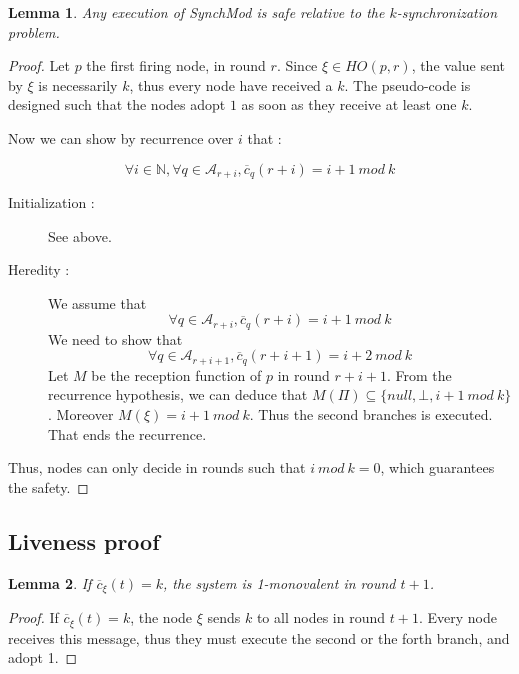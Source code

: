 \documentclass{article}
\newtheorem{lemma}{Lemma}[section]
\begin{document}
\begin{lemma}\label{lem:safety}
	Any execution of SynchMod is safe relative to the $k$-synchronization problem.
\end{lemma}
\begin{proof}
	Let $p$ the first firing node, in round $r$.
	Since $\xi \in HO(p,r)$, the value sent by $\xi$ is necessarily $k$, thus every node have received a $k$.
	The pseudo-code is designed such that the nodes adopt $1$ as soon as they receive at least one $k$.

	Now we can show by recurrence over $i$ that :

	$$\forall i \in \mathds{N}, \forall q \in \mathcal{A}_{r+i}, \overline{c}_q(r+i) = i + 1~mod~k$$

	\begin{description}
		\item[Initialization :] See above.
		\item[Heredity :] We assume that 
			$$\forall q \in \mathcal{A}_{r+i}, \overline{c}_q(r+i) = i + 1~mod~k$$
	We need to show that 
			$$\forall q \in \mathcal{A}_{r+i+1}, \overline{c}_q(r+i+1) = i + 2~mod~k$$
	Let $M$ be the reception function of $p$ in round $r+i+1$.
			From the recurrence hypothesis, we can deduce that $M(\Pi) \subseteq \{null, \bot, i+1~mod~k\}$.
			Moreover $M(\xi) = i+1~mod~k$.
			Thus the second branches is executed. That ends the recurrence.
	\end{description}

	Thus, nodes can only decide in rounds such that $i~mod~k = 0$, which guarantees the safety.
\end{proof}

\subsection{Liveness proof}

\begin{lemma}\label{lem:k_mono}
	If $\overline{c}_\xi(t) = k$, the system is 1-monovalent in round $t+1$.
\end{lemma}
\begin{proof}
	If $\overline{c}_\xi(t) = k$, the node $\xi$ sends $k$ to all nodes in round $t+1$.
	Every node receives this message, thus they must execute the second or the forth branch, and adopt 1.
\end{proof}
\end{document}
